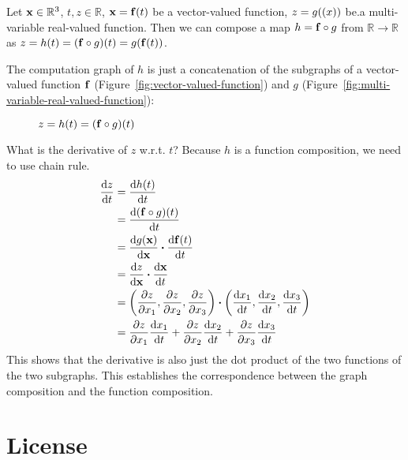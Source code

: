 \documentclass[11pt]{article}
\newcommand{\numset}[1]{\mathbb{#1}}
\newcommand{\compo}{\circ}
\begin{document}
Let $\vb{x} \in \numset{R}^3$, $t, z \in \numset{R}$, $\vb{x} = \vb{f}(t)$ be a vector-valued function, $z = g(\vb(x))$ be.a multi-variable real-valued function.  Then we can compose a map $h = \vb{f} \compo g$ from $\numset{R} \rightarrow \numset{R}$ as $z = h(t) = \qty(\vb{f} \compo g)(t) = g(\vb{f}(t))$.

The computation graph of $h$ is just a concatenation of the subgraphs of a vector-valued function $\vb{f}$ (Figure~\ref{fig:vector-valued-function}) and $g$ (Figure~\ref{fig:multi-variable-real-valued-function}):
\begin{figure}[h]
		\centering
		\caption{$z = h(t) = (\vb{f} \compo g)(t)$}
\end{figure}

What is the derivative of $z$ w.r.t. $t$? Because $h$ is a function composition, we need to use chain rule.
\begin{align}
	\dv{z}{t} &= \dv{h(t)}{t} \\
	&= \dv{(\vb{f} \compo g)(t)}{t} \\
	&= \dv{g(\vb{x})}{\vb{x}} \vdot \dv{\vb{f}(t)}{t} \\
	&= \dv{z}{\vb{x}} \vdot \dv{\vb{x}}{t} \\
	&= \qty(\pdv{z}{x_1}, \pdv{z}{x_2}, \pdv{z}{x_3}) \vdot \qty(\dv{x_1}{t}, \dv{x_2}{t}, \dv{x_3}{t}) \\
	&= \pdv{z}{x_1}\dv{x_1}{t} + \pdv{z}{x_2}\dv{x_2}{t} + \pdv{z}{x_3}\dv{x_3}{t}
\end{align}
This shows that the derivative is also just the dot product of the two functions of the two subgraphs.  This establishes the correspondence between the graph composition and the function composition.


\section{License}
\doclicenseThis
\end{document}
